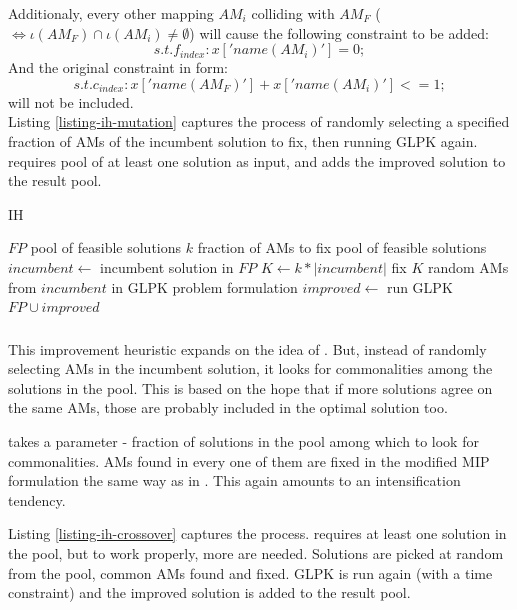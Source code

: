 Additionaly, every other mapping $AM_i$ colliding with $AM_F$ ($\iff \iota(AM_F) \cap \iota(AM_i) \neq \emptyset$) will cause the following constraint to be added:
\[s.t. f_{index}: x['name(AM_i)'] = 0;\]
And the original constraint in form:
\[s.t. c_{index}: x['name(AM_F)'] + x['name(AM_i)'] <= 1;\]
will not be included.\\

Listing \ref{listing-ih-mutation} captures the process of randomly selecting a specified fraction of AMs of the incumbent solution to fix, then running GLPK again.  requires pool of at least one solution as input, and adds the improved solution to the result pool.

\begin{algorithm}
\caption{ IH}
\label{listing-ih-mutation}
\begin{algorithmic}
\REQUIRE $FP$ pool of feasible solutions
\REQUIRE $k$ fraction of AMs to fix
\ENSURE pool of feasible solutions
\STATE $incumbent \gets $ incumbent solution in $FP$
\STATE $K \gets k * |incumbent|$
\STATE fix $K$ random AMs from $incumbent$ in GLPK problem formulation
\STATE $improved \gets $ run GLPK
\RETURN $FP \cup improved$
\end{algorithmic}
\end{algorithm}

\subsubsection{}

This improvement heuristic expands on the idea of . But, instead of randomly selecting AMs in the incumbent solution, it looks for commonalities among the solutions in the pool. This is based on the hope that if more solutions agree on the same AMs, those are probably included in the optimal solution too.

 takes a parameter - fraction of solutions in the pool among which to look for commonalities. AMs found in every one of them are fixed in the modified MIP formulation the same way as in . This again amounts to an intensification tendency.

Listing \ref{listing-ih-crossover} captures the process.  requires at least one solution in the pool, but to work properly, more are needed. Solutions are picked at random from the pool, common AMs found and fixed. GLPK is run again (with a time constraint) and the improved solution is added to the result pool.

